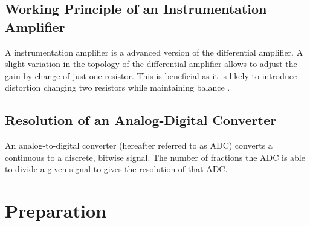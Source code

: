         \subsection*{Working Principle of an Instrumentation Amplifier}
            A instrumentation amplifier is a advanced version of the differential amplifier. A slight variation in the topology
            of the differential amplifier allows to adjust the gain by change of just one resistor. This is beneficial as
            it is likely to introduce distortion changing two resistors while maintaining balance \cite{instrumentation.amp.lessons.electric.circuits.20200216,instrumentation.amp.Kuphaldt.20150217}.
        \subsection*{Resolution of an Analog-Digital Converter}
            An analog-to-digital converter (hereafter referred to as ADC) converts a continuous to a discrete, bitwise signal.
            The number of fractions the ADC is able to divide a given signal to gives the resolution of that ADC.
    \section{Preparation}
